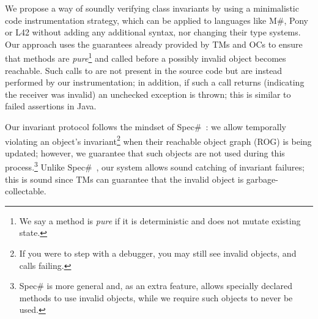 
We propose a way of soundly verifying class invariants by using a minimalistic code instrumentation strategy, which can be applied to languages like M\#, Pony or  L42  without adding any additional syntax, nor changing their type systems. Our approach uses the guarantees already provided by TMs and OCs to ensure that \Q@invariant@ methods are \emph{pure}\footnote{We say a method is \emph{pure} if it is deterministic and does not mutate existing state.} and called before a possibly invalid object becomes reachable. Such calls to \Q@invariant@ are not present in the source code but are instead performed by our instrumentation; in addition, if such a call returns \Q@false@ (indicating the receiver was invalid) an unchecked exception is thrown; this is similar to failed assertions in Java.


Our invariant protocol follows the mindset of Spec\#~\cite{?}: we allow temporally violating an object's invariant\footnote{If you were to step with a debugger, you may still see invalid objects, and \Q@invariant@ calls failing.} when their reachable object graph (ROG) is being updated; however, we guarantee that such objects are not used during this process.\footnote{Spec\# is more general and, as an extra feature, allows specially declared methods to use invalid objects, while we require such objects to never be used.}
Unlike Spec\#~\cite{?}, our system allows sound catching of invariant failures; this is sound since TMs can guarantee that the invalid object is garbage-collectable.

